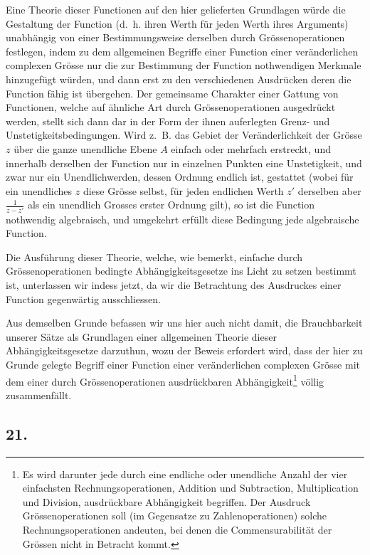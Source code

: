\documentclass[12pt,a4paper]{article}
\begin{document}
Eine Theorie dieser Functionen auf den hier gelieferten Grundlagen würde die Gestaltung der Function (d.~h. ihren Werth für jeden Werth ihres Arguments) unabhängig von einer Bestimmungsweise derselben durch Grössenoperationen festlegen, indem zu dem allgemeinen Begriffe einer Function einer veränderlichen complexen Grösse nur die zur Bestimmung der Function nothwendigen Merkmale hinzugefügt würden, und dann erst zu den verschiedenen Ausdrücken deren die Function fähig ist übergehen. Der gemeinsame Charakter einer Gattung von Functionen, welche auf ähnliche Art durch Grössenoperationen ausgedrückt werden, stellt sich dann dar in der Form der ihnen auferlegten Grenz- und Unstetigkeitsbedingungen. Wird z.~B. das Gebiet der Veränderlichkeit der Grösse $z$ über die ganze unendliche Ebene $A$ einfach oder mehrfach erstreckt, und innerhalb derselben der Function nur in einzelnen Punkten eine Unstetigkeit, und zwar nur ein Unendlichwerden, dessen Ordnung endlich ist, gestattet (wobei für ein unendliches $z$ diese Grösse selbst, für jeden endlichen Werth $z'$ derselben aber $\frac{1}{z-z'}$ als ein unendlich Grosses erster Ordnung gilt), so ist die Function nothwendig algebraisch, und umgekehrt erfüllt diese Bedingung jede algebraische Function.

Die Ausführung dieser Theorie, welche, wie bemerkt, einfache durch Grössenoperationen bedingte Abhängigkeitsgesetze ins Licht zu setzen bestimmt ist, unterlassen wir indess jetzt, da wir die Betrachtung des Ausdruckes einer Function gegenwärtig ausschliessen.

Aus demselben Grunde befassen wir uns hier auch nicht damit, die Brauchbarkeit unserer Sätze als Grundlagen einer allgemeinen Theorie dieser Abhängigkeitsgesetze darzuthun, wozu der Beweis erfordert wird, dass der hier zu Grunde gelegte Begriff einer Function einer veränderlichen complexen Grösse mit dem einer durch Grössenoperationen ausdrückbaren Abhängigkeit\footnote{Es wird darunter jede durch eine endliche oder unendliche Anzahl der vier einfachsten Rechnungsoperationen, Addition und Subtraction, Multiplication und Division, ausdrückbare Abhängigkeit begriffen. Der Ausdruck Grössenoperationen soll (im Gegensatze zu Zahlenoperationen) solche Rechnungsoperationen andeuten, bei denen die Commensurabilität der Grössen nicht in Betracht kommt.} völlig zusammenfällt.

\subsection*{21.}
\end{document}
